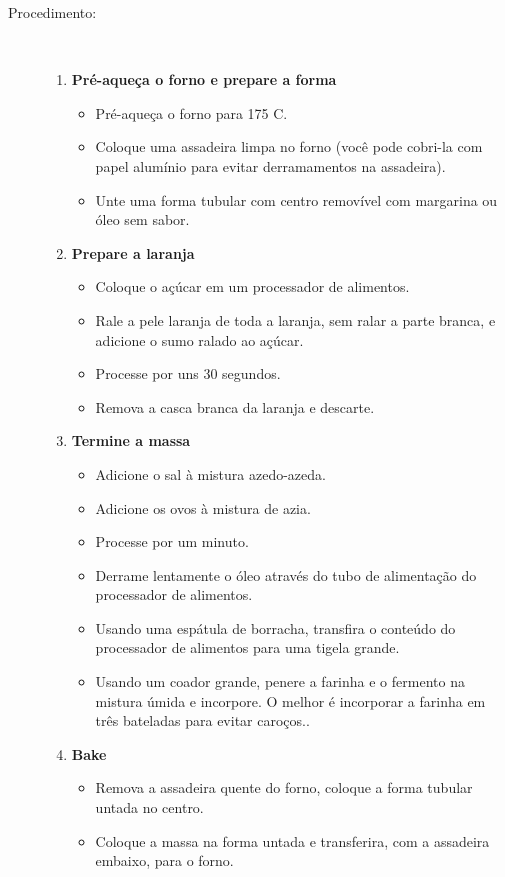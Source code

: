 \documentclass [11pt, letterpaper] {article}
\begin{document}
\begin {description}
\item [Procedimento:] \ \\
\begin {enumerate}
\item {\bf Pré-aqueça o forno e prepare a forma}
\begin {itemize}
\item Pré-aqueça o forno para 175 C.
\item Coloque uma assadeira limpa no forno (você pode cobri-la com papel alumínio para evitar derramamentos na assadeira).
\item Unte uma forma tubular com centro removível com margarina ou
\'oleo sem sabor.
\end {itemize}
\item {\bf Prepare a laranja}
\begin {itemize}
\item Coloque o açúcar em um processador de alimentos.
\item Rale a pele laranja de toda  a laranja, sem ralar a parte
branca, e adicione o sumo ralado ao açúcar.
\item Processe por uns 30 segundos.
\item Remova a casca branca da laranja e descarte.
\end {itemize}
\item {\bf Termine a massa}
\begin {itemize}
\item Adicione o sal à mistura azedo-azeda.
\item Adicione os ovos à mistura de azia.
\item Processe por um minuto.
\item Derrame lentamente o óleo através do tubo de alimentação do processador de alimentos.
\item Usando uma espátula de borracha, transfira o conteúdo do processador de alimentos para uma tigela grande.
\item Usando um coador grande, penere a farinha e o fermento na
mistura úmida e incorpore. O melhor é incorporar a farinha em três bateladas para evitar caro\c{c}os..
\end {itemize}
\item {\bf Bake}
\begin {itemize}
\item Remova a assadeira quente do forno, coloque a forma tubular untada no centro.
\item Coloque a massa na forma untada e transferira, com a assadeira embaixo, para o forno.

\end{itemize}
\end{enumerate}
\end{description}
\end{document}
